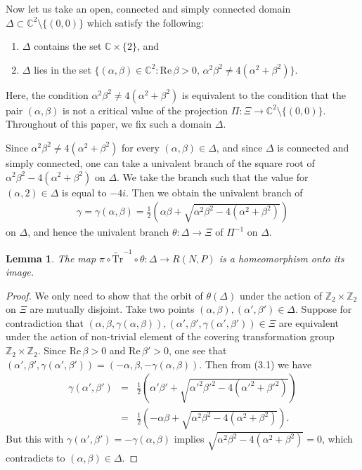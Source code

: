 \documentclass[12pt]{article}
\theoremstyle{plain}
\newtheorem{lem}[thm]{Lemma}
\theoremstyle{definition}
\theoremstyle{remark}
\newcommand{\C}{\mathbb C}
\newcommand{\Z}{\mathbb Z}
\newcommand{\alp}{\alpha}
\newcommand{\wt}{\widetilde}
\newcommand{\sm}{\setminus}
\newcommand{\Tr}{{\mathrm{Tr}}}
\newcommand{\re}{\mathrm{Re}}
\begin{document}
Now let us take an open, connected and simply connected domain 
$\Delta \subset \C^2 \sm\{(0,0)\}$ 
which satisfy the following: 
\begin{enumerate}
\item $\Delta$ contains the set $\C \times \{2\}$, and 
\item $\Delta$ lies  in the set $\{(\alpha,\beta) \in \C^2 : \re\, \beta>0,\, 
\alpha^2\beta^2\ne 4(\alpha^2+\beta^2)\}$. 
\end{enumerate}
%
Here, the condition $\alpha^2\beta^2\ne 4(\alpha^2+\beta^2)$ is equivalent to the condition that 
the pair $(\alp,\beta)$ is not a critical value of the projection $\Pi:\Xi \to \C^2 \sm \{(0,0)\}$. 
Throughout of this paper, we fix such a domain $\Delta$. 

Since $\alpha^2\beta^2\ne 4(\alpha^2+\beta^2)$ for every $(\alp,\beta) \in \Delta$, 
and since $\Delta$ is connected and simply connected, one can take a univalent branch of the square root of 
$\alpha^2\beta^2- 4(\alpha^2+\beta^2)$ on $\Delta$. 
We take the  branch such that the value for $(\alp,2) \in \Delta$ is equal to  $-4i$. 
Then we obtain the univalent branch 
of 
\begin{eqnarray}
\gamma=\gamma(\alp,\beta)=\frac{1}{2}\left( \alpha \beta + \sqrt{\alpha^2\beta^2-4(\alpha^2+\beta^2)}\right) 
\end{eqnarray}
on $\Delta$, and hence the univalent branch $\theta: \Delta \to \Xi$ of $\Pi^{-1}$ on $\Delta$. 
%
\begin{lem}\label{branch}
The map 
$
\pi   \circ \wt \Tr^{-1} \circ \theta:\Delta \to R(N,P)
$
is a homeomorphism onto its image. 
\end{lem}
%
\begin{proof}
We only need to show that the orbit of $ \theta(\Delta)$ under the action of $\Z_2 \times \Z_2$  on $\Xi$
are mutually disjoint. 
Take two points $(\alp,\beta), (\alp',\beta') \in \Delta$.  
Suppose for contradiction that 
$(\alp,\beta, \gamma(\alp,\beta)), (\alp',\beta',\gamma(\alp',\beta')) \in\Xi $ are equivalent 
under the action of non-trivial element of the covering transformation group $\Z_2 \times \Z_2$. 
Since $\re\,\beta>0$ and $\re\,\beta'>0$, 
one see that $(\alp',\beta',\gamma(\alp',\beta'))=(-\alp,\beta, -\gamma(\alp,\beta))$. 
Then from (3.1) we have 
%
\begin{eqnarray*}
\gamma(\alp',\beta')&=&\frac{1}{2}\left( \alpha' \beta' + \sqrt{\alpha'^2\beta'^2-4(\alpha'^2+\beta'^2)}\right) \\
&=&\frac{1}{2}\left( -\alpha \beta + \sqrt{\alpha^2\beta^2-4(\alpha^2+\beta^2)}\right). 
\end{eqnarray*}
But this with $\gamma(\alp',\beta')=-\gamma(\alp,\beta)$ implies $\sqrt{\alpha^2\beta^2-4(\alpha^2+\beta^2)}=0$, 
which contradicts to $(\alp,\beta) \in \Delta$. 
\end{proof}
\end{document}
